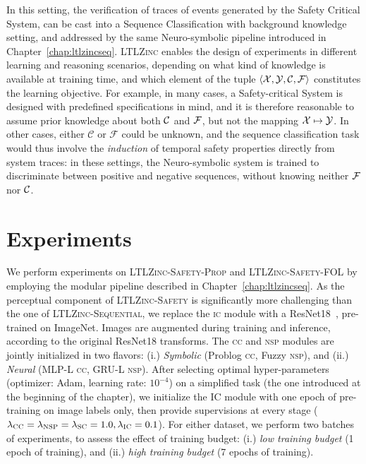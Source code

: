 In this setting, the verification of traces of events generated by the Safety Critical System, can be cast into a Sequence Classification with background knowledge setting, and addressed by the same Neuro-symbolic pipeline introduced in Chapter~\ref{chap:ltlzincseq}.
%
\textsc{LTLZinc} enables the design of experiments in different learning and reasoning scenarios, depending on what kind of knowledge is available at training time, and which element of the tuple  $\langle {\mathcal{X}}, {\mathcal{Y}}, {\mathcal{C}}, {\mathcal{F}} \rangle$ constitutes the learning objective. For example, in many cases, a Safety-critical System is designed with predefined specifications in mind, and it is therefore reasonable to assume prior knowledge about both ${\mathcal{C}}$ and ${\mathcal{F}}$, but not the mapping ${\mathcal{X}} \mapsto {\mathcal{Y}}$.
In other cases, either $\mathcal{C}$ or $\mathcal{F}$ could be unknown, and the sequence classification task would thus involve the \textit{induction} of temporal safety properties directly from system traces: in these settings, the Neuro-symbolic system is trained to discriminate between positive and negative sequences, without knowing neither ${\mathcal{F}}$ nor ${\mathcal{C}}$.

\section{Experiments}
We perform experiments on \textsc{LTLZinc-Safety-Prop} and \textsc{LTLZinc-Safety-FOL} by employing the modular pipeline described in Chapter~\ref{chap:ltlzincseq}.
As the perceptual component of \textsc{LTLZinc-Safety} is significantly more challenging than the one of \textsc{LTLZinc-Sequential}, we replace the \textsc{ic} module with a ResNet18~\cite{he2016deep}, pre-trained on ImageNet. 
Images are augmented during training and inference, according to the original ResNet18 transforms.
The \textsc{cc} and \textsc{nsp} modules are jointly initialized in two flavors: (i.) \textit{Symbolic} (Problog \textsc{cc}, Fuzzy \textsc{nsp}), and (ii.) \textit{Neural} (MLP-L \textsc{cc}, GRU-L \textsc{nsp}).
%
After selecting optimal hyper-parameters (optimizer: Adam, learning rate: $10^{-4}$) on a simplified task (the one introduced at the beginning of the chapter), we initialize the \textsc{IC} module with one epoch of pre-training on image labels only, then provide supervisions at every stage ($\lambda_{\textsc{CC}} = \lambda_{\textsc{NSP}} = \lambda_{\textsc{SC}} = 1.0, \lambda_\textsc{IC} = 0.1$). For either dataset, we perform two batches of experiments, to assess the effect of training budget: (i.) \textit{low training budget} (1 epoch of training), and (ii.) \textit{high training budget} (7 epochs of training).

